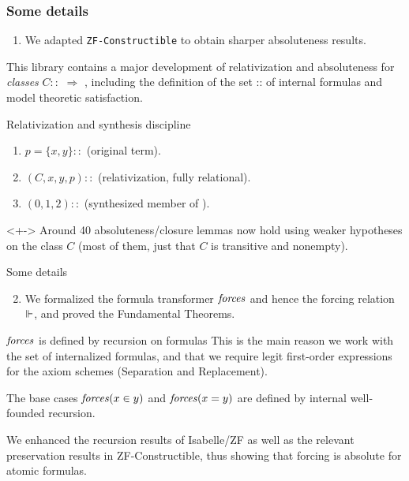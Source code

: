 \documentclass[english]{beamer}
\newcommand{\uscore}{\isacharunderscore}
\begin{document}
\begin{frame}
  \frametitle{Some details}
  \begin{alertblock}{}
    \begin{enumerate}%
    \item We adapted \texttt{ZF-Constructible} to obtain
      sharper absoluteness results.
    \end{enumerate}
  \end{alertblock}

  This library contains a major development of relativization and
  absoluteness for \emph{classes} $C :: {}$  $\Rightarrow$
  , including the definition of the set  ::
   of internal formulas and model theoretic satisfaction. 
  \pause
  \begin{block}{Relativization and synthesis discipline}
    \begin{enumerate}[I]
    \item<+-> $p=\{x,y\} :: {}$
      \hfill
      (original term).
    \item<+-> $(C,x,y,p) :: {}$
      \hfill
      (relativization, fully
      relational). 
    \item<+-> \isatt{upair{\uscore}fm}$(0,1,2) :: {}$ 
      \hfill
      (synthesized member of ).
    \end{enumerate}
  \end{block}
  \begin{alertblock}{}<+->
    Around 40 absoluteness/closure lemmas now hold using weaker
    hypotheses on the class $C$ (most of them, just that $C$ is
    transitive and nonempty).
  \end{alertblock}
\end{frame}

\begin{frame}{Some details}
  \begin{alertblock}{}
    \begin{enumerate}\setcounter{enumi}{1}
    \item We formalized the formula transformer $\mathit{forces}$ and
      hence the forcing relation $\Vdash$, and proved the Fundamental
      Theorems.
    \end{enumerate}
  \end{alertblock}
  \pause
  \begin{block}{$\mathit{forces}$ is defined by recursion on  formulas}
    This is the main reason we work with the set of internalized
    formulas, and that we require legit first-order expressions for
    the axiom schemes (Separation and Replacement).

    The base cases  $\mathit{forces}(x\in y)$ and  $\mathit{forces}(x =
    y)$ are  defined by \alert{internal} well-founded
    recursion.
  \end{block}
  \pause
  \begin{alertblock}{}
    We enhanced the recursion results of Isabelle/ZF as well as
    the relevant preservation results in ZF-Constructible, thus
    showing that forcing is absolute for atomic formulas.
  \end{alertblock}
\end{frame}
\end{document}
